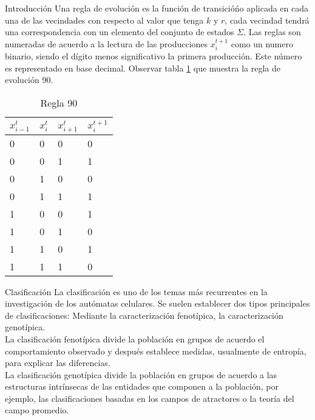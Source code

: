 \documentclass{article}
\begin{document}
\begin{section}{Introducción}
        \noindent Una regla de evolución es la función de transicióńo aplicada en cada una de las vecindades con respecto al valor que tenga $k$ y $r$, cada vecindad tendrá una correspondencia con un elemento del conjunto de estados $\Sigma$. Las reglas son numeradas de acuerdo a la lectura de las producciones $x^{t+1}_{i}$ como un numero binario, siendo el dígito menos significativo la primera producción. Este número es representado en base decimal. Observar tabla \ref{regla190Trans} que muestra la regla de evolución 90. 
        
        \begin{table}[H]
        \centering
        \begin{spacing}{1.5}
        \begin{tabular}{lll|l}
        $x_{i-1}^{t}$ & $x_{i}^{t}$ & $x_{i+1}^{t}$ & $x_{i}^{t+1}$  \\\hline
        0 & 0 & 0 & 0 \\
        0 & 0 & 1 & 1 \\
        0 & 1 & 0 & 0 \\
        0 & 1 & 1 & 1 \\
        1 & 0 & 0 & 1 \\
        1 & 0 & 1 & 0 \\
        1 & 1 & 0 & 1 \\
        1 & 1 & 1 & 0
        \end{tabular}
        
        \caption{Regla 90}
        \label{regla190Trans}
        \end{spacing}
        
        \end{table}

        
        \begin{subsection}{Clasificación}
            \noindent La clasificación es uno de los temas más recurrentes en la investigación de los autómatas celulares. Se suelen establecer dos tipos principales de clasificaciones: Mediante la caracterización fenotípica, la caracterización genotípica.\\
            \noindent La clasificación fenotípica divide la población en grupos de acuerdo el comportamiento observado y después establece medidas, usualmente de entropía, para explicar las diferencias.\\
            \noindent La clasificación genotípica divide la población en grupos de acuerdo a las estructuras intrínsecas de las entidades que componen a la población, por ejemplo, las clasificaciones basadas en los campos de atractores o la teoría del campo promedio. \cite{meanField}
            

\end{subsection}
\end{section}
\end{document}

